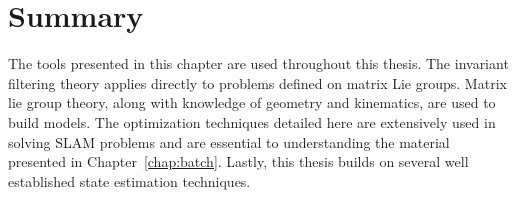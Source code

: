 \section{Summary}

The tools presented in this chapter are used throughout this thesis. The invariant filtering theory applies directly to problems defined on matrix Lie groups. Matrix lie group theory, along with knowledge of geometry and kinematics, are used to build models. The optimization techniques detailed here are extensively used in solving SLAM problems and are essential to understanding the material presented in Chapter~\ref{chap:batch}. Lastly, this thesis builds on several well established state estimation techniques.


